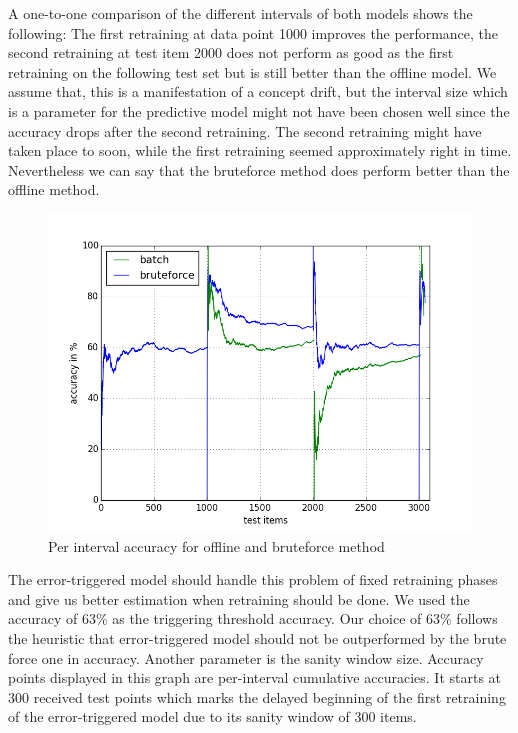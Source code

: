 \documentclass{article} %
\begin{document}
A one-to-one comparison of the different intervals of both models shows the following: The first retraining at data point 1000 improves the performance, the second retraining at test item 2000 does not perform as good as the first retraining on the following test set but is still better than the offline model. We assume that, this is a manifestation of a concept drift, but the interval size which is a parameter for the predictive model might not have been chosen well since the accuracy drops after the second retraining. The second retraining might have taken place to soon, while the first retraining seemed approximately right in time. Nevertheless we can say that the bruteforce method does perform better than the offline method.
\begin{figure}[htbp]
  \centering
  \includegraphics[scale=0.5]{./plots/bruteforce_batch.png}
  \caption{Per interval accuracy for offline and bruteforce method}
\end{figure}

The error-triggered model should handle this problem of fixed retraining phases and give us better estimation when retraining should be done. We used the accuracy of 63\% as the triggering threshold accuracy. Our choice of 63\% follows the heuristic that error-triggered model should not be outperformed by the brute force one in accuracy. Another parameter is the sanity window size. Accuracy points displayed in this graph are per-interval cumulative accuracies. It starts at 300 received test points which marks the delayed beginning of the first retraining of the error-triggered model due to its sanity window of 300 items.
 
\end{document}

